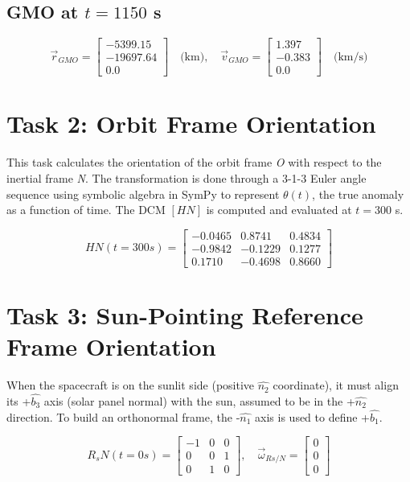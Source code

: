 \documentclass[conf]{article}
\begin{document}
\subsection*{GMO at $t = 1150$ s}
\[
\vec{r}_{GMO} = 
\begin{bmatrix}
-5399.15 \\ -19697.64 \\ 0.0
\end{bmatrix} \quad \text{(km)}, \quad
\vec{v}_{GMO} = 
\begin{bmatrix}
1.397 \\ -0.383 \\ 0.0
\end{bmatrix} \quad \text{(km/s)}
\]

\section{Task 2: Orbit Frame Orientation}
This task calculates the orientation of the orbit frame \textit{O} with respect to the inertial frame \textit{N}. The transformation is done through a 3-1-3 Euler angle sequence using symbolic algebra in SymPy to represent $\theta(t)$, the true anomaly as a function of time. The DCM $[HN]$ is computed and evaluated at $t = 300$ s.

\[
HN(t = 300s) = 
\begin{bmatrix}
-0.0465 & 0.8741 & 0.4834 \\
-0.9842 & -0.1229 & 0.1277 \\
0.1710 & -0.4698 & 0.8660
\end{bmatrix}
\]

\section{Task 3: Sun-Pointing Reference Frame Orientation}
When the spacecraft is on the sunlit side (positive $\hat{n_2}$ coordinate), it must align its +$\hat{b_3}$ axis (solar panel normal) with the sun, assumed to be in the +$\hat{n_2}$ direction. To build an orthonormal frame, the -$\hat{n_1}$ axis is used to define +$\hat{b_1}$.

\[
R_sN(t = 0s) = 
\begin{bmatrix}
-1 & 0 & 0 \\
0 & 0 & 1 \\
0 & 1 & 0
\end{bmatrix}, \quad
\vec{\omega}_{Rs/N} = 
\begin{bmatrix}
0 \\ 0 \\ 0
\end{bmatrix}
\]
\end{document}
